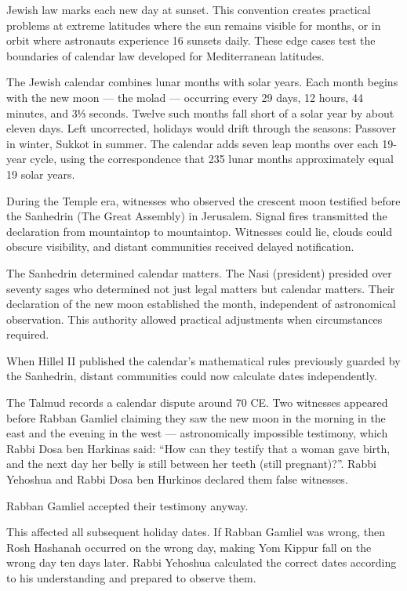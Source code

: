 Jewish law marks each new day at sunset. This convention creates practical problems at extreme latitudes where the sun remains visible for months, or in orbit where astronauts experience 16 sunsets daily. These edge cases test the boundaries of calendar law developed for Mediterranean latitudes.

The Jewish calendar combines lunar months with solar years. Each month begins with the new moon — the molad — occurring every 29 days, 12 hours, 44 minutes, and 3⅓ seconds. Twelve such months fall short of a solar year by about eleven days. Left uncorrected, holidays would drift through the seasons: Passover in winter, Sukkot in summer. The calendar adds seven leap months over each 19-year cycle, using the correspondence that 235 lunar months approximately equal 19 solar years.

During the Temple era, witnesses who observed the crescent moon testified before the Sanhedrin (The Great Assembly) in Jerusalem. Signal fires transmitted the declaration from mountaintop to mountaintop. Witnesses could lie, clouds could obscure visibility, and distant communities received delayed notification.

The Sanhedrin determined calendar matters. The Nasi (president) presided over seventy sages who determined not just legal matters but calendar matters. Their declaration of the new moon established the month, independent of astronomical observation. This authority allowed practical adjustments when circumstances required.

When Hillel II published the calendar's mathematical rules previously guarded by the Sanhedrin, distant communities could now calculate dates independently. 

The Talmud records a calendar dispute around 70 CE. Two witnesses appeared before Rabban Gamliel claiming they saw the new moon in the morning in the east and the evening in the west — astronomically impossible testimony, which Rabbi Dosa ben Harkinas said: “How can they testify that a woman gave birth, and the next day her belly is still between her teeth (still pregnant)?”. Rabbi Yehoshua and Rabbi Dosa ben Hurkinos declared them false witnesses.

Rabban Gamliel accepted their testimony anyway.

This affected all subsequent holiday dates. If Rabban Gamliel was wrong, then Rosh Hashanah occurred on the wrong day, making Yom Kippur fall on the wrong day ten days later. Rabbi Yehoshua calculated the correct dates according to his understanding and prepared to observe them.

